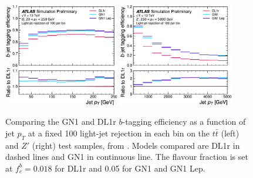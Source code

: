 \begin{figure}[h!]
  \centering
  \includegraphics[width=0.45\textwidth]{Images/FTAG/GN/GN1/eff/ptttb.png}
  \includegraphics[width=0.45\textwidth]{Images/FTAG/GN/GN1/eff/ptzpb.png}
  \caption{Comparing the GN1 and DL1r $b$-tagging efficiency as a function of jet $p_T$ at a fixed 100 light-jet rejection in each bin on the $t\bar{t}$ (left) and $Z'$ (right) test samples, from \cite{ATL-PHYS-PUB-2022-027}. Models compared are DL1r in dashed lines and GN1 in continuous line. The flavour fraction is set at $f^b_c = 0.018$ for DL1r and 0.05 for GN1 and GN1 Lep.}
  \label{fig:GN1ptb}
\end{figure} 

